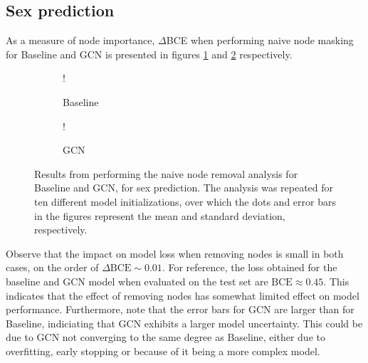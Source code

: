 \subsection{Sex prediction}
As a measure of node importance, $\Delta$BCE when performing naive node masking for Baseline and GCN is presented in figures \ref{fig:naive_sex_baseline} and \ref{fig:naive_sex_gcn} respectively.

\begin{figure}[H]
    \centering
        \begin{subfigure}{.5\textwidth}
            \centering
            \begin{center}
                \resizebox {1.0\linewidth} {!} {
                    
                }
            \end{center}
            \caption{Baseline}
            \label{fig:naive_sex_baseline}
        \end{subfigure}%
        \begin{subfigure}{.5\textwidth}
            \centering
            \begin{center}
                \resizebox {1.0\linewidth} {!} {
                    
                }
            \end{center}
            \caption{GCN}
            \label{fig:naive_sex_gcn}
        \end{subfigure}
    \caption{Results from performing the naive node removal analysis for Baseline and GCN, for sex prediction. The analysis was repeated for ten different model initializations, over which the dots and error bars in the figures represent the mean and standard deviation, respectively.}
    \label{fig:naive_sex}
\end{figure}

Observe that the impact on model loss when removing nodes is small in both cases, on the order of $\Delta \text{BCE} \sim 0.01$. For reference, the loss obtained for the baseline and GCN model when evaluated on the test set are $\text{BCE} \approx 0.45$. This indicates that the effect of removing nodes has somewhat limited effect on model performance. Furthermore, note that the error bars for GCN are larger than for Baseline, indiciating that GCN exhibits a larger model uncertainty. This could be due to GCN not converging to the same degree as Baseline, either due to overfitting, early stopping or because of it being a more complex model.

